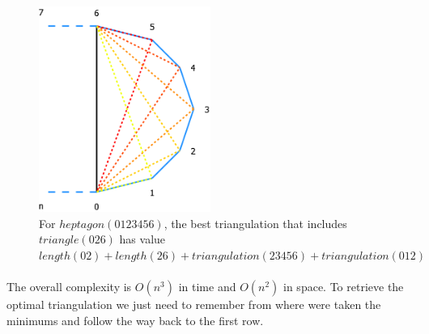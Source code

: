 \begin{figure}[h]
	\centering
		\includegraphics[width=0.5\textwidth]{Diagramme2.png}
	\caption{For $heptagon(0123456)$, the best triangulation that includes $triangle(026)$ has value $length(02) + length(26) + triangulation(23456) + triangulation(012)$}
	\label{fig:Diagramme2}
\end{figure}

\paragraph{}
The overall complexity is $O(n^3)$ in time and $O(n^2)$ in space. To retrieve the optimal triangulation we just need to remember from where were taken the minimums and follow the way back to the first row.

